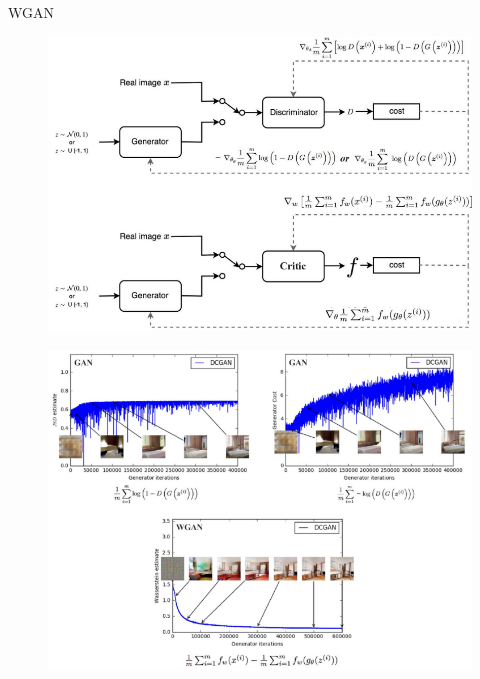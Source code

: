 \begin{frame}[allowframebreaks]{WGAN}
\begin{figure}
    \centering
    \includegraphics[height=0.9\textheight, width=\textwidth, keepaspectratio]{images/gan/wgan_3.png}
\end{figure}

\framebreak
\begin{figure}
    \centering
    \includegraphics[height=0.9\textheight, width=\textwidth, keepaspectratio]{images/gan/wgan_4.png}
\end{figure}


\end{frame}
